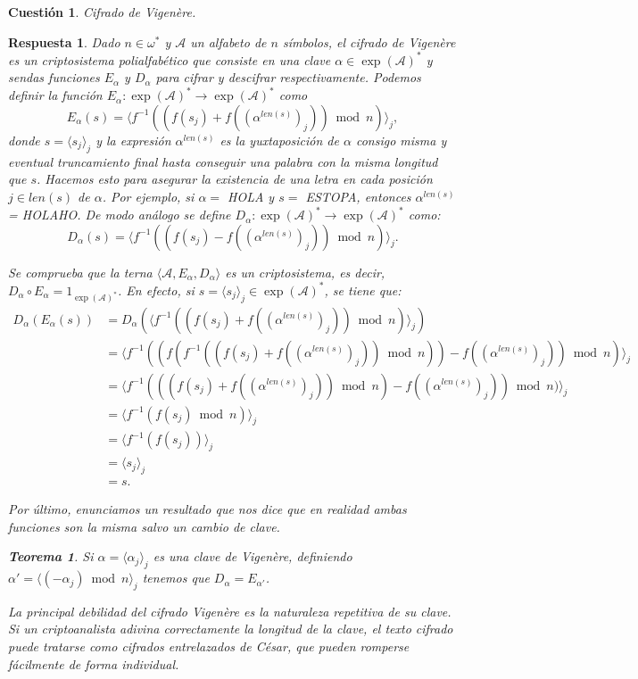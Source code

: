 \documentclass[
  a4paper,
  spanish,
  12pt,
]{scrartcl}
\theoremstyle{ejercicio-style}
\newtheorem{ejer}{Cuestión}
\theoremstyle{remark-style}
\newtheorem*{sol}{Respuesta}
\theoremstyle{teorema-style}
\newtheorem*{nth}{Teorema}
\begin{document}
\newpage

\begin{ejer}
  Cifrado de Vigenère.
\end{ejer}

\begin{sol}
  Dado $n \in \omega^\ast$ y $\mathcal{A}$ un alfabeto de $n$ símbolos, el cifrado de Vigenère es un criptosistema polialfabético que consiste en una clave $\alpha\in \exp (\mathcal{A})^*$ y sendas funciones $E_\alpha$ y $D_\alpha$ para cifrar y descifrar respectivamente. Podemos definir la función $E_\alpha: \exp (\mathcal{A})^* \to \exp (\mathcal{A})^*$ como
\[ E_\alpha (s) = \langle f^{-1}( (f(s_j) + f((\alpha^{len(s)})_j)) \bmod  n)\rangle _j, \]
donde $s = \langle s_j \rangle_j$ y la expresión $\alpha^{len(s)}$ es la yuxtaposición de $\alpha$ consigo misma y eventual truncamiento final hasta conseguir una palabra con la misma longitud que $s$. Hacemos esto para asegurar la existencia de una letra en cada posición $j \in len(s)$ de $\alpha$. Por ejemplo, si $\alpha = $ HOLA y $s=$ ESTOPA, entonces $\alpha^{len(s)}$ = HOLAHO. De modo análogo se define $D_\alpha: \exp (\mathcal{A})^* \to \exp (\mathcal{A})^*$ como:
 \[D_\alpha (s) = \langle f^{-1}( (f(s_j) - f((\alpha^{len(s)})_j)) \bmod  n)\rangle _j.\]

  Se comprueba que la terna $\langle \mathcal{A}, E_\alpha, D_\alpha \rangle$ es un criptosistema, es decir,  $D_\alpha \circ E_\alpha = 1_{\exp(\mathcal A)^*}$. En efecto, si $s=\langle s_j \rangle _j \in \exp(\mathcal A)^*$, se tiene que:
\begin{align*}
  D_\alpha(E_\alpha(s)) &= D_\alpha(\langle f^{-1}( (f(s_j) + f((\alpha^{len(s)})_j)) \bmod  n)\rangle _j)\\
  &= \langle f^{-1}((f(f^{-1}( (f(s_j) + f((\alpha^{len(s)})_j)) \bmod  n)) - f((\alpha^{len(s)})_j)) \bmod  n)\rangle _j\\
  &= \langle f^{-1}(( (f(s_j) + f((\alpha^{len(s)})_j)) \bmod  n) - f((\alpha^{len(s)})_j)) \bmod  n)\rangle _j\\
  &= \langle f^{-1}(f(s_j)\bmod  n)\rangle _j\\
  &= \langle f^{-1}(f(s_j))\rangle _j\\
  &= \langle s_j\rangle _j\\
  &= s.
\end{align*}

  Por último, enunciamos un resultado que nos dice que en realidad ambas funciones son la misma salvo un cambio de clave.

\begin{nth}
      Si $\alpha = \langle \alpha_j \rangle_j$ es una clave de Vigenère, definiendo $\alpha' = \langle (-\alpha_j) \bmod  n \rangle _j$ tenemos que $D_\alpha = E_{\alpha'}$.
\end{nth}


La principal debilidad del cifrado Vigenère es la naturaleza repetitiva de su clave. Si un criptoanalista adivina correctamente la longitud de la clave, el texto cifrado puede tratarse como cifrados entrelazados de César, que pueden romperse fácilmente de forma individual.
\end{sol}
\end{document}
